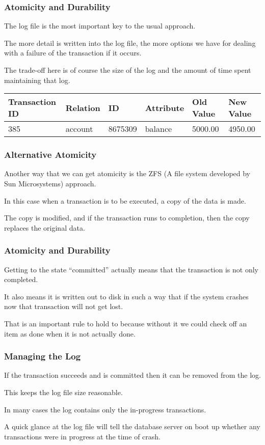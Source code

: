 \begin{frame}
\frametitle{Atomicity and Durability}

The log file is the most important key to the usual approach. 

The more detail is written into the log file, the more options we have for dealing with a failure of the transaction if it occurs. 

The trade-off here is of course the size of the log and the amount of time spent maintaining that log. 


\begin{center}
\begin{tabular}{|l|l|l|l|l|l|}\hline
	\textbf{Transaction ID} & \textbf{Relation} & \textbf{ID} & \textbf{Attribute} & \textbf{Old Value} & \textbf{New Value}\\ \hline
	385 & account & 8675309 & balance & 5000.00 & 4950.00 \\ \hline
\end{tabular}
\end{center}



\end{frame}

\begin{frame}
\frametitle{Alternative Atomicity}

Another way that we can get atomicity is the ZFS (A file system developed by Sun Microsystems) approach. 

In this case when a transaction is to be executed, a copy of the data is made. 

The copy is modified, and if the transaction runs to completion, then the copy replaces the original data. 


\end{frame}

\begin{frame}
\frametitle{Atomicity and Durability}

Getting to the state ``committed'' actually means that the transaction is not only completed. 

It also means it is written out to disk in such a way that if the system crashes now that transaction will not get lost. 

That is an important rule to hold to because without it we could check off an item as done when it is not actually done.

\end{frame}

\begin{frame}
\frametitle{Managing the Log}

If the transaction succeeds and is committed then it can be removed from the log. 

This keeps the log file size reasonable. 

In many cases the log contains only the in-progress transactions. 

A quick glance at the log file will tell the database server on boot up whether any transactions were in progress at the time of crash.


\end{frame}

